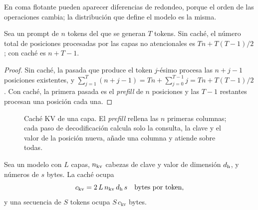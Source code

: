 En coma flotante pueden aparecer diferencias de redondeo, porque el orden de las operaciones cambia; la distribución que define el modelo es la misma.

\begin{proposicion}\label{prop:pasadas}
Sea un prompt de $n$ tokens del que se generan $T$ tokens. Sin caché, el número total de posiciones procesadas por las capas no atencionales es $Tn+T(T-1)/2$; con caché es $n+T-1$.
\end{proposicion}

\begin{proof}
Sin caché, la pasada que produce el token $j$-ésimo procesa las $n+j-1$ posiciones existentes, y $\sum_{j=1}^{T}(n+j-1)=Tn+\sum_{j=0}^{T-1}j=Tn+T(T-1)/2$. Con caché, la primera pasada es el \emph{prefill} de $n$ posiciones y las $T-1$ restantes procesan una posición cada una.
\end{proof}

\begin{figure}[h]
\centering
{}
\caption{Caché KV de una capa. El \emph{prefill} rellena las $n$ primeras columnas; cada paso de decodificación calcula solo la consulta, la clave y el valor de la posición nueva, añade una columna y atiende sobre todas.}
\label{fig:cache}
\end{figure}

\begin{proposicion}\label{prop:tam-cache}
Sea un modelo con $L$ capas, $n_{\mathrm{kv}}$ cabezas de clave y valor de dimensión $d_{\mathrm{h}}$, y números de $s$ bytes. La caché ocupa
\[
c_{\mathrm{kv}}=2\,L\,n_{\mathrm{kv}}\,d_{\mathrm{h}}\,s\quad\text{bytes por token,}
\]
y una secuencia de $S$ tokens ocupa $S\,c_{\mathrm{kv}}$ bytes.
\end{proposicion}

